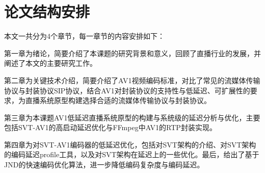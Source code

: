 \section{论文结构安排}

本文一共分为4个章节，每一章节的内容安排如下：

第一章为绪论，简要介绍了本课题的研究背景和意义，回顾了直播行业的发展，并阐述了本文的主要研究工作。

第二章为关键技术介绍，简要介绍了AV1视频编码标准，对比了常见的流媒体传输协议与封装协议SIP协议，结合AV1对封装协议的支持性与低延迟、可扩展性的要求，为直播系统原型构建选择合适的流媒体传输协议与封装协议。

第三章为本课题AV1低延迟直播系统原型的构建与系统级的延迟分析与优化，主要包括SVT-AV1的高启动延迟优化与FFmpeg中AV1的RTP封装实现。

第四章为对SVT-AV1编码器的低延迟优化，包括对SVT架构的介绍、对SVT架构的编码延迟profile工具，以及对SVT架构在延迟上的一些优化。最后，给出了基于JND的快速编码优化算法，进一步降低编码复杂度与编码延迟。
